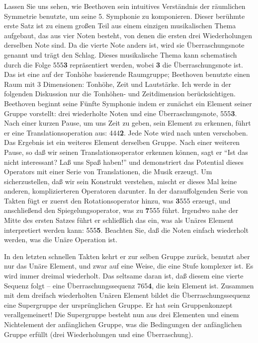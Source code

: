 Lassen Sie uns sehen, wie Beethoven sein intuitives Verständnis der räumlichen Symmetrie benutzte, um seine 5. Symphonie zu komponieren.
Dieser berühmte erste Satz ist zu einem großen Teil aus einem einzigen musikalischen Thema aufgebaut, das aus vier Noten besteht, von denen die ersten drei Wiederholungen derselben Note sind.
Da die vierte Note anders ist, wird sie Überraschungsnote genannt und trägt den Schlag.
Dieses musikalische Thema kann schematisch durch die Folge 555\textbf{3} repräsentiert werden, wobei \textbf{3} die Überraschungsnote ist.
Das ist eine auf der Tonhöhe basierende Raumgruppe; Beethoven benutzte einen Raum mit 3 Dimensionen: Tonhöhe, Zeit und Lautstärke.
Ich werde in der folgenden Diskussion nur die Tonhöhen- und Zeitdimension berücksichtigen.
Beethoven beginnt seine Fünfte Symphonie indem er zunächst ein Element seiner Gruppe vorstellt: drei wiederholte Noten und eine Überraschungsnote, 555\textbf{3}.
Nach einer kurzen Pause, um uns Zeit zu geben, sein Element zu erkennen, führt er eine Translationsoperation aus: 444\textbf{2}.
Jede Note wird nach unten verschoben.
Das Ergebnis ist ein weiteres Element derselben Gruppe.
Nach einer weiteren Pause, so daß wir seinen Translationsoperator erkennen können, sagt er \enquote{Ist das nicht interessant? Laß uns Spaß haben!} und demonstriert das Potential dieses Operators mit einer Serie von Translationen, die Musik erzeugt.
Um sicherzustellen, daß wir sein Konstrukt verstehen, mischt er dieses Mal keine anderen, komplizierteren Operatoren darunter.
In der darauffolgenden Serie von Takten fügt er zuerst den Rotationsoperator hinzu, was \textbf{3}555 erzeugt, und anschließend den Spiegelungsoperator, was zu \textbf{7}555 führt.
Irgendwo nahe der Mitte des ersten Satzes führt er schließlich das ein, was als Unäres Element interpretiert werden kann: 555\textbf{5}.
Beachten Sie, daß die Noten einfach wiederholt werden, was die Unäre Operation ist.

In den letzten schnellen Takten kehrt er zur selben Gruppe zurück, benutzt aber nur das Unäre Element, und zwar auf eine Weise, die eine Stufe komplexer ist.
Es wird immer dreimal wiederholt.
Das seltsame daran ist, daß diesem eine vierte Sequenz folgt -- eine Überraschungssequenz 765\textbf{4}, die kein Element ist.
Zusammen mit dem dreifach wiederholten Unären Element bildet die Überraschungssequenz eine Supergruppe der ursprünglichen Gruppe.
Er hat sein Gruppenkonzept verallgemeinert!
Die Supergruppe besteht nun aus drei Elementen und einem Nichtelement der anfänglichen Gruppe, was die Bedingungen der anfänglichen Gruppe erfüllt (drei Wiederholungen und eine Überraschung).

